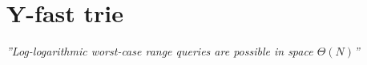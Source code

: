 \section{Y-fast trie}

\emph{''Log-logarithmic worst-case range queries are possible in space \( \Theta(N) \)''} \cite{Willard1983}

